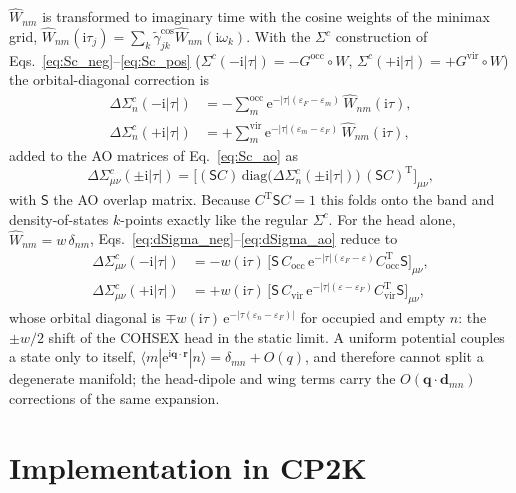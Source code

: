 \documentclass[%
 reprint,
superscriptaddress,
 amsmath,amssymb,
 aps,
prb,
]{revtex4-2}
\newcommand{\br}{\mathbf{r}}
\newcommand{\bq}{\mathbf{q}}
\newcommand{\ii}{\mathrm{i}}
\newcommand{\ee}{\mathrm{e}}
\newcommand{\Tr}{\mathrm{T}}
\newcommand{\occ}{\mathrm{occ}}
\newcommand{\vir}{\mathrm{vir}}
\newcommand{\Sov}{\mathsf{S}}%
\begin{document}
$\hat W_{nm}$ is transformed to imaginary time with the cosine weights of the minimax grid,
$\hat W_{nm}(\ii\tau_j) = \sum_k\tilde\gamma^{\cos}_{jk}\hat W_{nm}(\ii\omega_k)$. With the
$\Sigma^c$ construction of Eqs.~\eqref{eq:Sc_neg}--\eqref{eq:Sc_pos}
($\Sigma^c(-\ii|\tau|) = -G^\occ\circ W$, $\Sigma^c(+\ii|\tau|) = +G^\vir\circ W$) the
orbital-diagonal correction is
\begin{align}
  \Delta\Sigma^c_n(-\ii|\tau|) &= -\sum_{m}^{\occ} \ee^{-|\tau|(\varepsilon_F-\varepsilon_m)}\,\hat W_{nm}(\ii\tau),
  \label{eq:dSigma_neg}\\
  \Delta\Sigma^c_n(+\ii|\tau|) &= +\sum_{m}^{\vir} \ee^{-|\tau|(\varepsilon_m-\varepsilon_F)}\,\hat W_{nm}(\ii\tau),
  \label{eq:dSigma_pos}
\end{align}
added to the AO matrices of Eq.~\eqref{eq:Sc_ao} as
\begin{equation}
  \Delta\Sigma^c_{\mu\nu}(\pm\ii|\tau|) = \Big[(\Sov C)\,\mathrm{diag}\big(\Delta\Sigma^c_n(\pm\ii|\tau|)\big)\,(\Sov C)^\Tr\Big]_{\mu\nu},
  \label{eq:dSigma_ao}
\end{equation}
with $\Sov$ the AO overlap matrix. Because $C^\Tr\Sov C = 1$ this folds onto the band and
density-of-states $k$-points exactly like the regular $\Sigma^c$. For the head alone,
$\hat W_{nm} = w\,\delta_{nm}$, Eqs.~\eqref{eq:dSigma_neg}--\eqref{eq:dSigma_ao} reduce to
\begin{equation}
\begin{aligned}
  \Delta\Sigma^c_{\mu\nu}(-\ii|\tau|) &= -w(\ii\tau)\,\big[\Sov\,C_\occ\,\ee^{-|\tau|(\varepsilon_F-\varepsilon)}C_\occ^\Tr \Sov\big]_{\mu\nu},\\
  \Delta\Sigma^c_{\mu\nu}(+\ii|\tau|) &= +w(\ii\tau)\,\big[\Sov\,C_\vir\,\ee^{-|\tau|(\varepsilon-\varepsilon_F)}C_\vir^\Tr \Sov\big]_{\mu\nu},
\end{aligned}
  \label{eq:dSigma3d}
\end{equation}
whose orbital diagonal is $\mp w(\ii\tau)\,\ee^{-|\tau(\varepsilon_n-\varepsilon_F)|}$ for
occupied and empty $n$: the $\pm w/2$ shift of the COHSEX head in the static limit. A uniform
potential couples a state only to itself, $\langle m|\ee^{\ii\bq\cdot\br}|n\rangle =
\delta_{mn} + O(q)$, and therefore cannot split a degenerate manifold; the head-dipole and wing
terms carry the $O(\bq\cdot\mathbf d_{mn})$ corrections of the same expansion.

\section{Implementation in CP2K}
\label{sec:impl}
\end{document}
